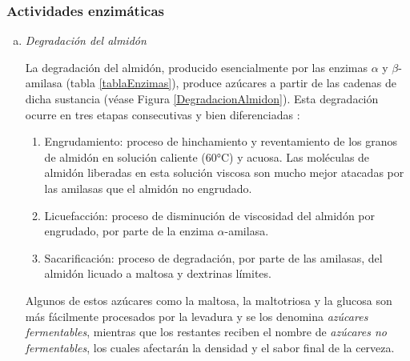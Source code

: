             \subsubsection{Actividades enzimáticas}
                \begin{enumerate}[a)]
                    \item \textit{Degradación del almidón}
                        \par La degradación del almidón, producido esencialmente por las enzimas $\alpha$ y $\beta$-amilasa (tabla \ref{tablaEnzimas}), produce azúcares a partir de las cadenas de dicha sustancia (véase Figura \ref{DegradacionAlmidon}). Esta degradación ocurre en tres etapas consecutivas y bien diferenciadas \cite{Kunze}:
                        
                        \begin{enumerate}[1.]
                            \item Engrudamiento: proceso de hinchamiento y reventamiento de los granos de almidón en solución caliente (60°C) y acuosa. Las moléculas de almidón liberadas en esta solución viscosa son mucho mejor atacadas por las amilasas que el almidón no engrudado.
                            
                            \item Licuefacción: proceso de disminución de viscosidad del almidón por engrudado, por parte de la enzima $\alpha$-amilasa.
                            
                            \item Sacarificación: proceso de degradación, por parte de las amilasas, del almidón licuado a maltosa y dextrinas límites.
                        \end{enumerate}
                        
                        \par Algunos de estos azúcares como la maltosa, la maltotriosa y la glucosa son más fácilmente procesados por la levadura y se los denomina \textit{azúcares fermentables}, mientras que los restantes reciben el nombre de \textit{azúcares no fermentables}, los cuales afectarán la densidad y el sabor final de la cerveza.
                        

\end{enumerate}
